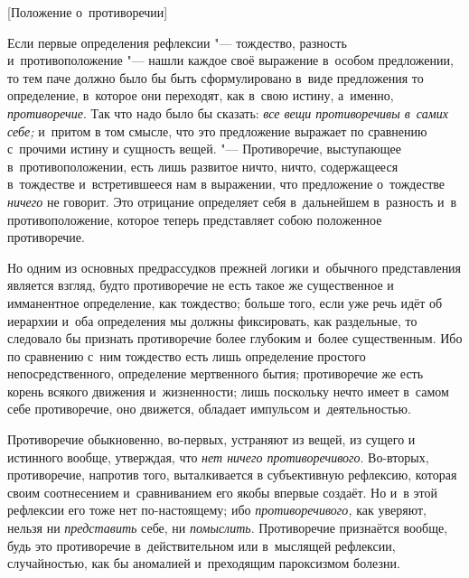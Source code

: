 %
  {[Положение о~противоречии]}

Если первые определения рефлексии "--- тождество, разность и~противоположение
"--- нашли каждое своё выражение в~особом предложении, то тем паче должно было
бы быть сформулировано в~виде предложения то определение, в~которое они
переходят, как в~свою истину, а~именно,
{\em противоречие}. Так что надо было бы сказать:
{\em все вещи противоречивы в~самих себе;} и~притом в
том смысле, что это предложение выражает по сравнению с~прочими истину и
сущность вещей. "--- Противоречие, выступающее в~противоположении, есть лишь
развитое ничто, ничто, содержащееся в~тождестве и~встретившееся нам в
выражении, что предложение о~тождестве {\em ничего} не
говорит. Это отрицание определяет себя в~дальнейшем в~разность и~в
противоположение, которое теперь представляет собою положенное противоречие.

Но одним из основных предрассудков прежней логики и~обычного представления
является взгляд, будто противоречие не есть такое же существенное и
имманентное определение, как тождество; больше того, если уже речь идёт об
иерархии и~оба определения мы должны фиксировать, как раздельные, то
следовало бы признать противоречие более глубоким и~более существенным. Ибо
по сравнению с~ним тождество есть лишь определение простого
непосредственного, определение мертвенного бытия; противоречие же есть
корень всякого движения и~жизненности; лишь поскольку нечто имеет в~самом
себе противоречие, оно движется, обладает импульсом и~деятельностью.

Противоречие обыкновенно, во-первых, устраняют из вещей, из сущего и
истинного вообще, утверждая, что {\em нет ничего
противоречивого}. Во-вторых, противоречие, напротив того, выталкивается в
субъективную рефлексию, которая своим соотнесением и~сравниванием его якобы
впервые создаёт. Но и~в этой рефлексии его тоже нет по-настоящему; ибо
{\em противоречивого,} как уверяют, нельзя ни {\em представить} себе, ни
{\em помыслить}. Противоречие признаётся вообще, будь
это противоречие в~действительном или в~мыслящей рефлексии, случайностью,
как бы аномалией и~преходящим пароксизмом болезни.

